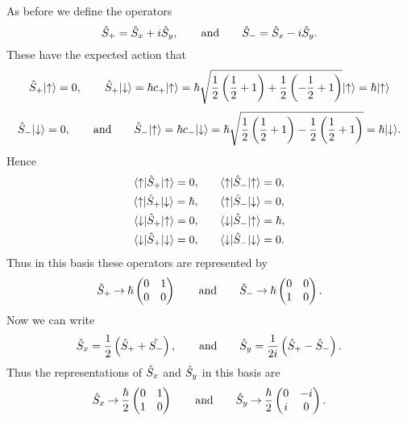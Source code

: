 \documentclass[a4paper]{article}
\renewcommand{\ket}[1]{\vert {#1} \rangle}
\renewcommand{\bra}[1]{\langle {#1} \vert}
\newcommand{\spinUp}{\uparrow}
\newcommand{\spinDown}{\downarrow}
\newcommand{\representation}{\mathbin{\rightarrow}}
\theoremstyle{definition}
\begin{document}
    As before we define the operators
    \[\hat{S}_+ = \hat{S}_x + i\hat{S}_y, \qquad\text{and}\qquad \hat{S}_- = \hat{S}_x - i\hat{S}_y.\]
    These have the expected action that
    \[\operator{S}_+\ket{\spinUp} = 0, \qquad \operator{S}_+\ket{\spinDown} = \hbar c_+\ket{\spinUp} = \hbar \sqrt{\frac{1}{2}\left(\frac{1}{2} + 1\right) + \frac{1}{2}\left(-\frac{1}{2} + 1\right)}\ket{\spinUp} = \hbar\ket{\spinUp}\]
    \[\operator{S}_-\ket{\spinDown} = 0, \qquad\text{and}\qquad \operator{S}_-\ket{\spinUp} = \hbar c_-\ket{\spinDown} = \hbar\sqrt{\frac{1}{2}\left(\frac{1}{2} + 1\right) - \frac{1}{2}\left(\frac{1}{2} + 1\right)} = \hbar\ket{\spinDown}.\]
    Hence
    \begin{align*}
        \bra{\spinUp}\operator{S}_+\ket{\spinUp} = 0, \qquad & \bra{\spinUp}\operator{S}_-\ket{\spinUp} = 0,\\
        \bra{\spinUp}\operator{S}_+\ket{\spinDown} = \hbar, \qquad & \bra{\spinUp}\operator{S}_-\ket{\spinDown} = 0,\\
        \bra{\spinDown}\operator{S}_+\ket{\spinUp} = 0, \qquad & \bra{\spinDown}\operator{S}_-\ket{\spinUp} = \hbar,\\
        \bra{\spinDown}\operator{S}_+\ket{\spinDown} = 0, \qquad & \bra{\spinDown}\operator{S}_-\ket{\spinDown} = 0.
    \end{align*}
    Thus in this basis these operators are represented by
    \[
        \operator{S}_+ \representation\hbar
        \begin{pmatrix}
            0 & 1\\
            0 & 0
        \end{pmatrix}
        \qquad\text{and}\qquad
        \operator{S}_- \representation\hbar
        \begin{pmatrix}
            0 & 0\\
            1 & 0
        \end{pmatrix}
        .
    \]
    Now we can write
    \[\hat{S}_x = \frac{1}{2}\left(\hat{S}_+ + \hat{S_-}\right), \qquad\text{and}\qquad \hat{S}_y = \frac{1}{2i}\left(\hat{S}_+ - \hat{S}_-\right).\]
    Thus the representations of \(\hat{S}_x\) and \(\hat{S}_y\) in this basis are
    \[
        \operator{S}_x \representation \frac{\hbar}{2}
        \begin{pmatrix}
            0 & 1\\
            1 & 0
        \end{pmatrix}
        \qquad\text{and}\qquad
        \operator{S}_y \representation \frac{\hbar}{2}
        \begin{pmatrix}
            0 & -i\\
            i & 0
        \end{pmatrix}
        .
    \]
\end{document}
